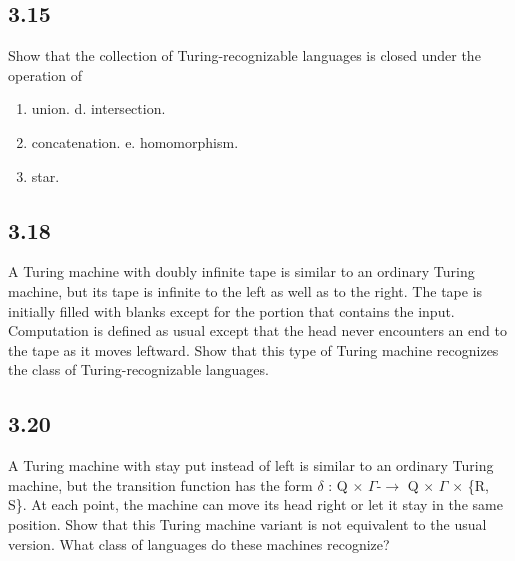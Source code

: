 \subsection*{3.15}

Show that the collection of Turing-recognizable languages is closed under the operation of

\begin{enumerate}[label=(\alph*), leftmargin=2.5em]

\item union. d. intersection.

\item concatenation. e. homomorphism.

\item star.

\end{enumerate}


\subsection*{3.18}

A Turing machine with doubly infinite tape is similar to an ordinary Turing machine, but its tape is infinite to the left as well as to the right. The tape is initially filled with blanks except for the portion that contains the input. Computation is defined as usual except that the head never encounters an end to the tape as it moves leftward. Show that this type of Turing machine recognizes the class of Turing-recognizable languages.


\subsection*{3.20}

A Turing machine with stay put instead of left is similar to an ordinary Turing machine, but the transition function has the form $\delta$ : Q $\times$ $\Gamma$-$\to$ Q $\times$ $\Gamma$ $\times$ \{R, S\}. At each point, the machine can move its head right or let it stay in the same position. Show that this Turing machine variant is not equivalent to the usual version. What class of languages do these machines recognize?


\clearpage
